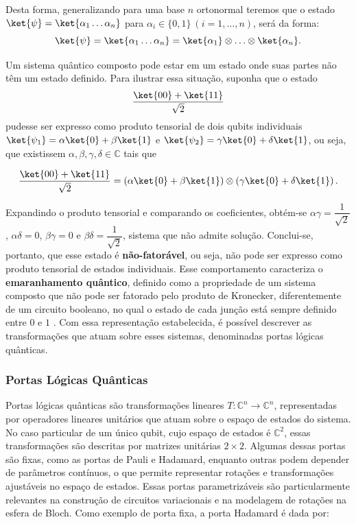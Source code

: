 Desta forma, generalizando para uma base $n$ ortonormal teremos que o estado $\ket{\psi}=\ket{\alpha_1\dots\alpha_n}$ para $\alpha_i\in \{0,1\}\ (i=1,\hdots,n)$, será da forma:
$$
    \ket{\psi}=\ket{\alpha_1\hdots\alpha_n}=\ket{\alpha_1}\otimes\hdots\otimes\ket{\alpha_n}.
$$

Um sistema quântico composto pode estar em um estado onde suas partes não têm um estado definido. Para ilustrar essa situação, suponha que o estado
$$\dfrac{\ket{00}+\ket{11}}{\sqrt{2}}$$
pudesse ser expresso como produto tensorial de dois qubits individuais $\ket{\psi_1}=\alpha\ket{0}+\beta\ket{1}$ e $\ket{\psi_2}=\gamma\ket{0}+\delta\ket{1}$, ou seja, que existissem $\alpha, \beta, \gamma, \delta \in \mathbb{C}$ tais que

\begin{equation}
    \label{eq:estado_bell}
    \dfrac{\ket{00}+\ket{11}}{\sqrt{2}} = \left(\alpha\ket{0}+\beta\ket{1}\right)\otimes\left(\gamma\ket{0}+\delta\ket{1}\right).
\end{equation}

\noindent Expandindo o produto tensorial e comparando os coeficientes, obtém-se $\alpha\gamma = \dfrac{1}{\sqrt{2}}$, $\alpha\delta=0$, $\beta\gamma=0$ e $\beta\delta=\dfrac{1}{\sqrt{2}}$, sistema que não admite solução. Conclui-se, portanto, que esse estado é \textbf{não-fatorável}, ou seja, não pode ser expresso como produto tensorial de estados individuais. Esse comportamento caracteriza o \textbf{emaranhamento quântico}, definido como a propriedade de um sistema composto que não pode ser fatorado pelo produto de Kronecker, diferentemente de um circuito booleano, no qual o estado de cada junção está sempre definido entre $0$ e $1$ \cite{Marquezino2019, lipton_quantum_2014}. Com essa representação estabelecida, é possível descrever as transformações que atuam sobre esses sistemas, denominadas portas lógicas quânticas.

\subsubsection{Portas Lógicas Quânticas}
Portas lógicas quânticas são transformações lineares $T:\mathbb{C}^n \rightarrow \mathbb{C}^n$, representadas por operadores lineares unitários que atuam sobre o espaço de estados do sistema. No caso particular de um único qubit, cujo espaço de estados é $\mathbb{C}^2$, essas transformações são descritas por matrizes unitárias $2\times 2$. Algumas dessas portas são fixas, como as portas de Pauli e Hadamard, enquanto outras podem depender de parâmetros contínuos, o que permite representar rotações e transformações ajustáveis no espaço de estados. Essas portas parametrizáveis são particularmente relevantes na construção de circuitos variacionais e na modelagem de rotações na esfera de Bloch. Como exemplo de porta fixa, a porta Hadamard é dada por:


